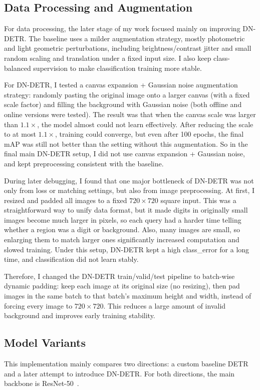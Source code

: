 \documentclass[runningheads]{llncs}
\begin{document}
\subsection{Data Processing and Augmentation}
For data processing, the later stage of my work focused mainly on improving DN-DETR. The baseline uses a milder augmentation strategy, mostly photometric and light geometric perturbations, including brightness/contrast jitter and small random scaling and translation under a fixed input size. I also keep class-balanced supervision to make classification training more stable.

For DN-DETR, I tested a canvas expansion + Gaussian noise augmentation strategy: randomly pasting the original image onto a larger canvas (with a fixed scale factor) and filling the background with Gaussian noise (both offline and online versions were tested). The result was that when the canvas scale was larger than $1.1\times$, the model almost could not learn effectively. After reducing the scale to at most $1.1\times$, training could converge, but even after 100 epochs, the final mAP was still not better than the setting without this augmentation. So in the final main DN-DETR setup, I did not use canvas expansion + Gaussian noise, and kept preprocessing consistent with the baseline.

During later debugging, I found that one major bottleneck of DN-DETR was not only from loss or matching settings, but also from image preprocessing. At first, I resized and padded all images to a fixed $720 \times 720$ square input. This was a straightforward way to unify data format, but it made digits in originally small images become much larger in pixels, so each query had a harder time telling whether a region was a digit or background. Also, many images are small, so enlarging them to match larger ones significantly increased computation and slowed training. Under this setup, DN-DETR kept a high class\_error for a long time, and classification did not learn stably.

Therefore, I changed the DN-DETR train/valid/test pipeline to batch-wise dynamic padding: keep each image at its original size (no resizing), then pad images in the same batch to that batch's maximum height and width, instead of forcing every image to $720 \times 720$. This reduces a large amount of invalid background and improves early training stability.

\subsection{Model Variants}
\label{sec:model}
This implementation mainly compares two directions: a custom baseline DETR and a later attempt to introduce DN-DETR. For both directions, the main backbone is ResNet-50~\cite{He2015DeepRL}.
\end{document}
